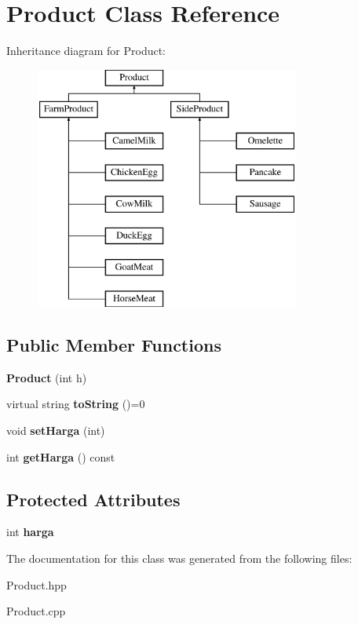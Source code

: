 \hypertarget{class_product}{}\section{Product Class Reference}
\label{class_product}
Inheritance diagram for Product\+:\begin{figure}[H]
\begin{center}
\leavevmode
\includegraphics[height=8.000000cm]{class_product}
\end{center}
\end{figure}
\subsection*{Public Member Functions}
\begin{DoxyCompactItemize}
\item 
\mbox{\label{class_product_a4e48c96db94f1a241f7b0ba57d07a295}} 
{\bfseries Product} (int h)
\item 
\mbox{\label{class_product_a2905713046dcfe86e3eb7c3b20888a36}} 
virtual string {\bfseries to\+String} ()=0
\item 
\mbox{\label{class_product_aff47f49b6fda50b62965035e02456d3e}} 
void {\bfseries set\+Harga} (int)
\item 
\mbox{\label{class_product_aaaa6866dd9d4e2c6d6f21cffcdd549c3}} 
int {\bfseries get\+Harga} () const
\end{DoxyCompactItemize}
\subsection*{Protected Attributes}
\begin{DoxyCompactItemize}
\item 
\mbox{\label{class_product_a987b9fc5fa69c36fec40d5e77a4cfa51}} 
int {\bfseries harga}
\end{DoxyCompactItemize}


The documentation for this class was generated from the following files\+:\begin{DoxyCompactItemize}
\item 
Product.\+hpp\item 
Product.\+cpp\end{DoxyCompactItemize}

